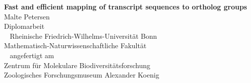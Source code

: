 \begin{center}
\null\vspace{2.23cm}
\textsf{\Huge\textbf{Fast and efficient mapping of transcript sequences to
ortholog groups}}\\
\vspace{8em}
\large{Malte Petersen}\\
\vfill
\normalsize{Diplomarbeit}\\
~\newline
\small
Rheinische Friedrich-Wilhelms-Universität Bonn\\
Mathematisch-Naturwissenschaftliche Fakultät\\
~\newline
angefertigt am\\
Zentrum für Molekulare Biodiversitätsforschung\\
Zoologisches Forschungsmuseum Alexander Koenig
\end{center}
